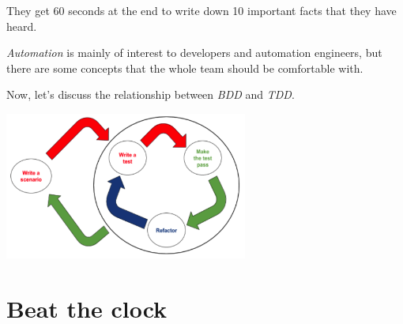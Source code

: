         They get 60 seconds at the end to write down 10 important facts that they have heard.
\fi 

\ifcontent

    \emph{Automation} is mainly of interest to developers and automation engineers, but there are some concepts that the whole team should be comfortable with.
    
    
    Now, let's discuss the relationship between \emph{BDD} and \emph{TDD}. \\

    \begin{center}
        \includegraphics[width=0.6\textwidth]{bdd-fundamentals/images/BDD-TDD-loop.png}
    \end{center}

    

    \chapter*{Beat the clock}
    
